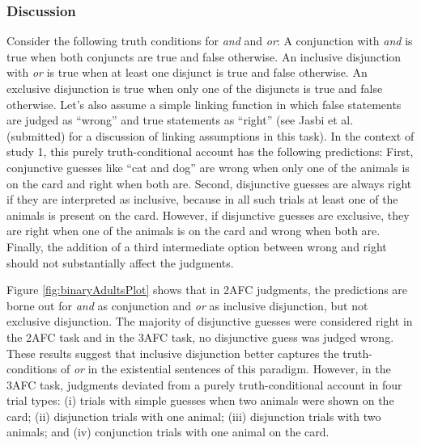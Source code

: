 \documentclass[floatsintext,man]{apa6}
\theoremstyle{definition}
\theoremstyle{definition}
\theoremstyle{definition}
\theoremstyle{remark}
\begin{document}
\subsubsection{Discussion}\label{discussion}

Consider the following truth conditions for \emph{and} and \emph{or}: A
conjunction with \emph{and} is true when both conjuncts are true and
false otherwise. An inclusive disjunction with \emph{or} is true when at
least one disjunct is true and false otherwise. An exclusive disjunction
is true when only one of the disjuncts is true and false otherwise.
Let's also assume a simple linking function in which false statements
are judged as \enquote{wrong} and true statements as \enquote{right}
(see Jasbi et al. (submitted) for a discussion of linking assumptions in
this task). In the context of study 1, this purely truth-conditional
account has the following predictions: First, conjunctive guesses like
\enquote{cat and dog} are wrong when only one of the animals is on the
card and right when both are. Second, disjunctive guesses are always
right if they are interpreted as inclusive, because in all such trials
at least one of the animals is present on the card. However, if
disjunctive guesses are exclusive, they are right when one of the
animals is on the card and wrong when both are. Finally, the addition of
a third intermediate option between wrong and right should not
substantially affect the judgments.

Figure \ref{fig:binaryAdultsPlot} shows that in 2AFC judgments, the
predictions are borne out for \emph{and} as conjunction and \emph{or} as
inclusive disjunction, but not exclusive disjunction. The majority of
disjunctive guesses were considered right in the 2AFC task and in the
3AFC task, no disjunctive guess was judged wrong. These results suggest
that inclusive disjunction better captures the truth-conditions of
\emph{or} in the existential sentences of this paradigm. However, in the
3AFC task, judgments deviated from a purely truth-conditional account in
four trial types: (i) trials with simple guesses when two animals were
shown on the card; (ii) disjunction trials with one animal; (iii)
disjunction trials with two animals; and (iv) conjunction trials with
one animal on the card.
\end{document}
